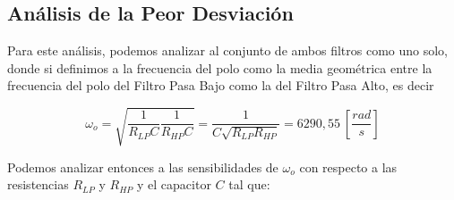 \documentclass[12pt,a4paper]{article}
\begin{document}
\subsection{Análisis de la Peor Desviación}
Para este análisis, podemos analizar al conjunto de ambos filtros como uno solo, donde si definimos a la frecuencia del polo como la media geométrica entre la frecuencia del polo del Filtro Pasa Bajo como la del Filtro Pasa Alto, es decir

\begin{equation}
    \label{eq_63}
    \omega_o = \sqrt{\frac{1}{R_{LP}C}\frac{1}{R_{HP}C}} = \frac{1}{C\sqrt{R_{LP}R_{HP}}} = 6290,55 \ \left[\frac{rad}{s}\right]
\end{equation}


Podemos analizar entonces a las sensibilidades de $\omega_o$ con respecto a las resistencias $R_{LP}$ y $R_{HP}$ y el capacitor $C$ tal que:
\end{document}

